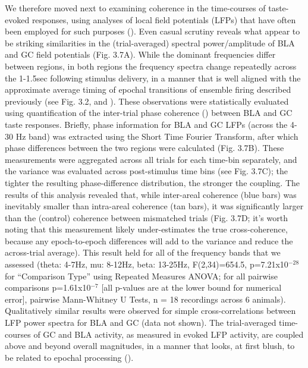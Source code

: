 \begin{refsection}
We therefore moved next to examining coherence in the time-courses of taste-evoked responses, using analyses of local field potentials (LFPs) that have often been employed for such purposes (\cite{antzoulatos2016a,place2016a,saravani2019a}). Even casual scrutiny reveals what appear to be striking similarities in the (trial-averaged) spectral power/amplitude of BLA and GC field potentials (Fig. 3.7A). While the dominant frequencies differ between regions, in both regions the frequency spectra change repeatedly across the 1-1.5sec following stimulus delivery, in a manner that is well aligned with the approximate average timing of epochal transitions of ensemble firing described previously (see Fig. 3.2, and \cite{fontanini2009a,katz2001a,sadacca2016a}). 
These observations were statistically evaluated using quantification of the inter-trial phase coherence (\cite{stitt2017a,engel2020a,kramer2020a,zareian2020a}) between BLA and GC taste responses. Briefly, phase information for BLA and GC LFPs (across the 4-30 Hz band) was extracted using the Short Time Fourier Transform, after which phase differences between the two regions were calculated (Fig. 3.7B). These measurements were aggregated across all trials for each time-bin separately, and the variance was evaluated across post-stimulus time bins (see Fig. 3.7C); the tighter the resulting phase-difference distribution, the stronger the coupling. The results of this analysis revealed that, while inter-areal coherence (blue bars) was inevitably smaller than intra-areal coherence (tan bars), it was significantly larger than the (control) coherence between mismatched trials (Fig. 3.7D; it’s worth noting that this measurement likely under-estimates the true cross-coherence, because any epoch-to-epoch differences will add to the variance and reduce the across-trial average). This result held for all of the frequency bands that we assessed (theta: 4-7Hz, mu: 8-12Hz, beta: 13-25Hz, F(2,34)=654.5, p=7.21x10$^{-28}$ for “Comparison Type” using Repeated Measures ANOVA; for all pairwise comparisons p=1.61x10$^{-7}$ [all p-values are at the lower bound for numerical error], pairwise Mann-Whitney U Tests, n = 18 recordings across 6 animals). Qualitatively similar results were observed for simple cross-correlations between LFP power spectra for BLA and GC (data not shown). The trial-averaged time-courses of GC and BLA activity, as measured in evoked LFP activity, are coupled above and beyond overall magnitudes, in a manner that looks, at first blush, to be related to epochal processing (\cite{katz2001a,fontanini2009a,sadacca2012a}).  


\end{refsection}
